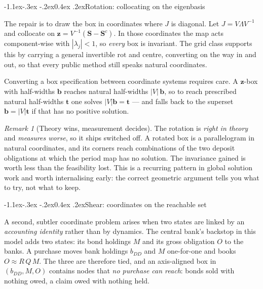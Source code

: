 \documentclass[10pt,a4paper]{article}
\makeatletter
\theoremstyle{definition}
\theoremstyle{plain}
\theoremstyle{remark}
\newtheorem{rem}[defn]{Remark}
\newcommand{\st}{\mathbf{S}}
\renewcommand\subsection{\@startsection{subsection}{2}{\z@}%
  {-1.1ex\@plus -.3ex \@minus -.2ex}{0.4ex \@plus .2ex}{\normalfont\normalsize\bfseries}}
\makeatother
\begin{document}
\subsection{Rotation: collocating on the eigenbasis}

The repair is to draw the box in coordinates where $J$ is diagonal. Let $J = V\Lambda V^{-1}$
and collocate on $\bm{z} = V^{-1}(\st - \st^{c})$. In those coordinates the map acts
component-wise with $|\lambda_j|<1$, so \emph{every} box is invariant. The grid class supports
this by carrying a general invertible $\mathrm{rot}$ and centre, converting on the way in and
out, so that every public method still speaks natural coordinates.

Converting a box specification between coordinate systems requires care. A $\bm{z}$-box with
half-widths $\bm{b}$ reaches natural half-widths $|V|\,\bm{b}$, so to reach prescribed natural
half-widths $\bm{t}$ one solves $|V|\bm{b} = \bm{t}$ --- and falls back to the superset
$\bm{b} = |V|\bm{t}$ if that has no positive solution.

\begin{rem}[Theory wins, measurement decides]
The rotation is \emph{right in theory} and \emph{measures worse}, so it ships switched off. A
rotated box is a parallelogram in natural coordinates, and its corners reach combinations of
the two deposit obligations at which the period map has no solution. The invariance gained is
worth less than the feasibility lost. This is a recurring pattern in global solution work and
worth internalising early: the correct geometric argument tells you what to try, not what to
keep.
\end{rem}

\subsection{Shear: coordinates on the reachable set}

A second, subtler coordinate problem arises when two states are linked by an \emph{accounting
identity} rather than by dynamics. The central bank's backstop in this model adds two states:
its bond holdings $M$ and its gross obligation $O$ to the banks. A purchase moves bank
holdings $b_{DD}$ and $M$ one-for-one and books $O \approx R\,Q\,M$. The three are therefore
tied, and an axis-aligned box in $(b_{DD}, M, O)$ contains nodes that \emph{no purchase can
reach}: bonds sold with nothing owed, a claim owed with nothing held.
\end{document}
